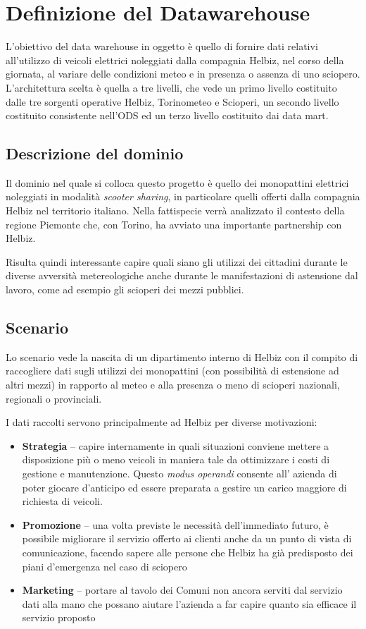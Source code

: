 \chapter{Definizione del Datawarehouse}

L'obiettivo del data warehouse in oggetto è quello di fornire dati relativi
all'utilizzo di veicoli elettrici noleggiati dalla compagnia Helbiz, nel corso
della giornata, al variare delle condizioni meteo e in presenza o assenza di uno
sciopero.
L'architettura scelta è quella a tre livelli, che vede un primo livello costituito
dalle tre sorgenti operative Helbiz, Torinometeo e Scioperi, un secondo livello
costituito consistente nell'ODS ed un terzo livello costituito dai data mart.

\section{Descrizione del dominio}
Il dominio nel quale si colloca questo progetto è quello dei monopattini elettrici noleggiati in
modalità \emph{scooter sharing}, in particolare quelli offerti dalla compagnia Helbiz nel territorio italiano.
Nella fattispecie verrà analizzato il contesto della regione Piemonte che, con Torino, ha avviato una importante
partnership con Helbiz.

Risulta quindi interessante capire quali siano gli utilizzi dei cittadini durante le diverse avversità metereologiche
anche durante le manifestazioni di astensione dal lavoro, come ad esempio gli scioperi dei mezzi pubblici.


\section{Scenario}
Lo scenario vede la nascita di un dipartimento interno di Helbiz con il compito di raccogliere dati sugli
utilizzi dei monopattini (con possibilità di estensione ad altri mezzi) in rapporto al meteo e alla presenza
o meno di scioperi nazionali, regionali o provinciali.

I dati raccolti servono principalmente ad Helbiz per diverse motivazioni:
\begin{itemize}
	\item{\textbf{Strategia} -- capire internamente in quali situazioni conviene mettere a disposizione più o meno veicoli in maniera tale da ottimizzare i costi di gestione e manutenzione.
	Questo \emph{modus operandi} consente all' azienda di poter giocare d'anticipo ed essere preparata a gestire un carico maggiore di richiesta di veicoli.}
	\item{\textbf{Promozione} -- una volta previste le necessità dell'immediato futuro, è possibile migliorare il servizio offerto ai clienti anche da un punto di vista di comunicazione,
	facendo sapere alle persone che Helbiz ha già predisposto dei piani d'emergenza nel caso di sciopero}
	\item{\textbf{Marketing} -- portare al tavolo dei Comuni non ancora serviti dal servizio dati alla mano che possano aiutare l'azienda a far capire quanto sia efficace il servizio proposto}
\end{itemize}

